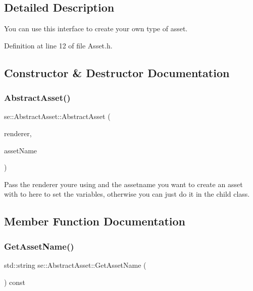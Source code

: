 \subsection{Detailed Description}
You can use this interface to create your own type of asset. 

Definition at line 12 of file Asset.\+h.



\subsection{Constructor \& Destructor Documentation}
\mbox{\label{classse_1_1_abstract_asset_acb27e3d7a54233b28ce430a67448506a}} 
\subsubsection{\texorpdfstring{Abstract\+Asset()}{AbstractAsset()}}
{\footnotesize\ttfamily se\+::\+Abstract\+Asset\+::\+Abstract\+Asset (\begin{DoxyParamCaption}\item[{\mbox{\hyperlink{classse_1_1_abstract_renderer}{Abstract\+Renderer}} $\ast$}]{renderer,  }\item[{const std\+::string \&}]{asset\+Name }\end{DoxyParamCaption})}

Pass the renderer you\textquotesingle{}re using and the assetname you want to create an asset with to here to set the variables, otherwise you can just do it in the child class. 

\subsection{Member Function Documentation}
\mbox{\label{classse_1_1_abstract_asset_aae608bfd21c9b7a8370b0a7e37e7349c}} 
\subsubsection{\texorpdfstring{Get\+Asset\+Name()}{GetAssetName()}}
{\footnotesize\ttfamily std\+::string se\+::\+Abstract\+Asset\+::\+Get\+Asset\+Name (\begin{DoxyParamCaption}{ }\end{DoxyParamCaption}) const}

